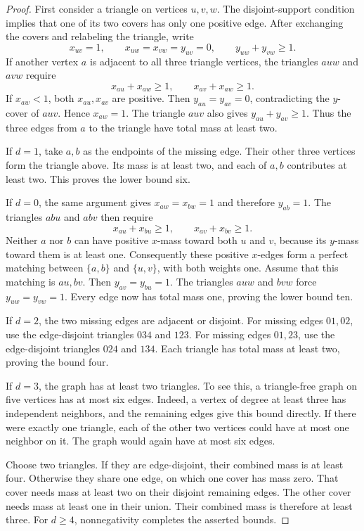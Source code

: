 \begin{proof}
First consider a triangle on vertices $u,v,w$.
The disjoint-support condition implies that one of its two covers has only one positive edge.
After exchanging the covers and relabeling the triangle, write
\[
 x_{uv}=1,\qquad x_{uw}=x_{vw}=y_{uv}=0,
 \qquad y_{uw}+y_{vw}\ge1.
\]
If another vertex $a$ is adjacent to all three triangle vertices, the triangles $auw$ and $avw$ require
\[
 x_{au}+x_{aw}\ge1,\qquad x_{av}+x_{aw}\ge1.
\]
If $x_{aw}<1$, both $x_{au},x_{av}$ are positive.
Then $y_{au}=y_{av}=0$, contradicting the $y$-cover of $auv$.
Hence $x_{aw}=1$.
The triangle $auv$ also gives $y_{au}+y_{av}\ge1$.
Thus the three edges from $a$ to the triangle have total mass at least two.

If $d=1$, take $a,b$ as the endpoints of the missing edge.
Their other three vertices form the triangle above.
Its mass is at least two, and each of $a,b$ contributes at least two.
This proves the lower bound six.

If $d=0$, the same argument gives $x_{aw}=x_{bw}=1$ and therefore $y_{ab}=1$.
The triangles $abu$ and $abv$ then require
\[
 x_{au}+x_{bu}\ge1,\qquad x_{av}+x_{bv}\ge1.
\]
Neither $a$ nor $b$ can have positive $x$-mass toward both $u$ and $v$, because its $y$-mass toward them is at least one.
Consequently these positive $x$-edges form a perfect matching between $\{a,b\}$ and $\{u,v\}$, with both weights one.
Assume that this matching is $au,bv$.
Then $y_{av}=y_{bu}=1$.
The triangles $auw$ and $bvw$ force $y_{uw}=y_{vw}=1$.
Every edge now has total mass one, proving the lower bound ten.

If $d=2$, the two missing edges are adjacent or disjoint.
For missing edges $01,02$, use the edge-disjoint triangles $034$ and $123$.
For missing edges $01,23$, use the edge-disjoint triangles $024$ and $134$.
Each triangle has total mass at least two, proving the bound four.

If $d=3$, the graph has at least two triangles.
To see this, a triangle-free graph on five vertices has at most six edges.
Indeed, a vertex of degree at least three has independent neighbors, and the remaining edges give this bound directly.
If there were exactly one triangle, each of the other two vertices could have at most one neighbor on it.
The graph would again have at most six edges.

Choose two triangles.
If they are edge-disjoint, their combined mass is at least four.
Otherwise they share one edge, on which one cover has mass zero.
That cover needs mass at least two on their disjoint remaining edges.
The other cover needs mass at least one in their union.
Their combined mass is therefore at least three.
For $d\ge4$, nonnegativity completes the asserted bounds.
\end{proof}

